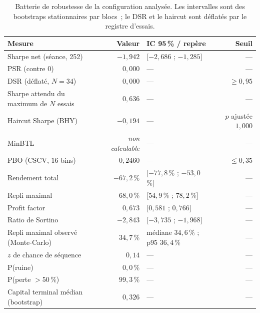 \begin{table}[htbp]
\centering
\footnotesize
\caption{Batterie de robustesse de la configuration analysée. Les intervalles sont des bootstraps stationnaires par blocs~; le DSR et le haircut sont déflatés par le registre d'essais.}
\label{tab:x10_robustness}
\begin{tabular}{l r l r}
\toprule
\textbf{Mesure} & \textbf{Valeur} & \textbf{IC 95\,\% / repère} & \textbf{Seuil} \\
\midrule
Sharpe net (séance, 252) & $-1{,}942$ & [$-2{,}686$ ; $-1{,}285$] & --- \\
PSR (contre $0$) & $0{,}000$ & --- & --- \\
DSR (déflaté, $N = 34$) & $0{,}000$ & --- & $\geq 0{,}95$ \\
Sharpe attendu du maximum de $N$ essais & $0{,}636$ & --- & --- \\
Haircut Sharpe (BHY) & $-0{,}194$ & --- & $p$ ajustée $1{,}000$ \\
MinBTL & \emph{non calculable} & --- & --- \\
PBO (CSCV, $16$ bins) & $0{,}2460$ & --- & $\leq 0{,}35$ \\
\midrule
Rendement total & $-67{,}2$\,\% & [$-77{,}8$\,\% ; $-53{,}0$\,\%] & --- \\
Repli maximal & $68{,}0$\,\% & [$54{,}9$\,\% ; $78{,}2$\,\%] & --- \\
Profit factor & $0{,}673$ & [$0{,}581$ ; $0{,}766$] & --- \\
Ratio de Sortino & $-2{,}843$ & [$-3{,}735$ ; $-1{,}968$] & --- \\
\midrule
Repli maximal observé (Monte-Carlo) & $34{,}7$\,\% & médiane $34{,}6$\,\% ; p95 $36{,}4$\,\% & --- \\
$z$ de chance de séquence & $0{,}14$ & --- & --- \\
P(ruine) & $0{,}0$\,\% & --- & --- \\
P(perte $> 50$\,\%) & $99{,}3$\,\% & --- & --- \\
Capital terminal médian (bootstrap) & $0{,}326$ & --- & --- \\
\bottomrule
\end{tabular}
\end{table}
